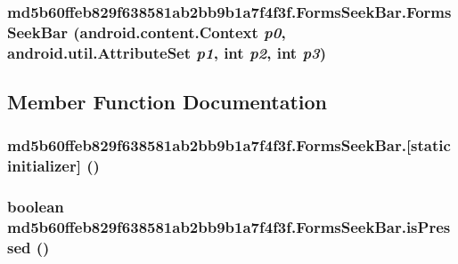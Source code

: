 \hypertarget{classmd5b60ffeb829f638581ab2bb9b1a7f4f3f_1_1_forms_seek_bar_fadadb0b016eb3d0ebcb4b884852a46d}{
\subsubsection[{FormsSeekBar}]{\setlength{\rightskip}{0pt plus 5cm}md5b60ffeb829f638581ab2bb9b1a7f4f3f.FormsSeekBar.FormsSeekBar (android.content.Context {\em p0}, \/  android.util.AttributeSet {\em p1}, \/  int {\em p2}, \/  int {\em p3})}}
\label{classmd5b60ffeb829f638581ab2bb9b1a7f4f3f_1_1_forms_seek_bar_fadadb0b016eb3d0ebcb4b884852a46d}




\subsection{Member Function Documentation}
\hypertarget{classmd5b60ffeb829f638581ab2bb9b1a7f4f3f_1_1_forms_seek_bar_b987ffc3fa8efe58477490cc2020ac77}{
\subsubsection[{[static initializer]}]{\setlength{\rightskip}{0pt plus 5cm}md5b60ffeb829f638581ab2bb9b1a7f4f3f.FormsSeekBar.\mbox{[}static initializer\mbox{]} ()}}
\label{classmd5b60ffeb829f638581ab2bb9b1a7f4f3f_1_1_forms_seek_bar_b987ffc3fa8efe58477490cc2020ac77}


\hypertarget{classmd5b60ffeb829f638581ab2bb9b1a7f4f3f_1_1_forms_seek_bar_5ba10e44e1797cb266b3fa57c4604e42}{
\subsubsection[{isPressed}]{\setlength{\rightskip}{0pt plus 5cm}boolean md5b60ffeb829f638581ab2bb9b1a7f4f3f.FormsSeekBar.isPressed ()}}
\label{classmd5b60ffeb829f638581ab2bb9b1a7f4f3f_1_1_forms_seek_bar_5ba10e44e1797cb266b3fa57c4604e42}


